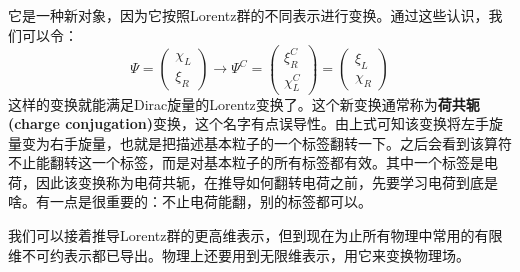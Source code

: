 它是一种新对象，因为它按照Lorentz群的不同表示进行变换。通过这些认识，我们可以令：
\begin{equation}
\label{equ3.236}
    \Psi =
        \begin{pmatrix}
            \chi_L \\ \xi_R
        \end{pmatrix}
    \rightarrow
    \Psi^C =
        \begin{pmatrix}
            \xi_R^C \\ \chi_L^C
        \end{pmatrix}
    =
        \begin{pmatrix}
            \xi_L \\ \chi_R
        \end{pmatrix}
\end{equation}
这样的变换就能满足Dirac旋量的Lorentz变换了。这个新变换通常称为{\bf 荷共轭(charge conjugation)}变换，这个名字有点误导性。由上式可知该变换将左手旋量变为右手旋量，也就是把描述基本粒子的一个标签翻转一下。之后会看到该算符不止能翻转这一个标签，而是对基本粒子的所有标签都有效。其中一个标签是电荷，因此该变换称为电荷共轭，在推导如何翻转电荷之前，先要学习电荷到底是啥。有一点是很重要的：不止电荷能翻，别的标签都可以。

我们可以接着推导Lorentz群的更高维表示，但到现在为止所有物理中常用的有限维不可约表示都已导出。物理上还要用到无限维表示，用它来变换物理场。

